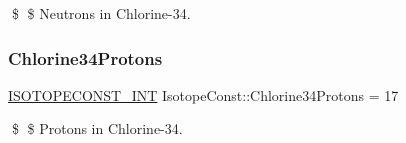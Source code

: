 \$ \$ Neutrons in Chlorine-\/34. \mbox{\label{group___isotope_const-_chlorine-_cl34_ga47e99456c0e42e0f3241373bab87582e}} 
\subsubsection{\texorpdfstring{Chlorine34\+Protons}{Chlorine34Protons}}
{\footnotesize\ttfamily \mbox{\hyperlink{group___isotope_const-_macros_ga5f18360b3e99483a35c32d789e62621c}{I\+S\+O\+T\+O\+P\+E\+C\+O\+N\+S\+T\+\_\+\+I\+NT}} Isotope\+Const\+::\+Chlorine34\+Protons = 17}

\$ \$ Protons in Chlorine-\/34. 